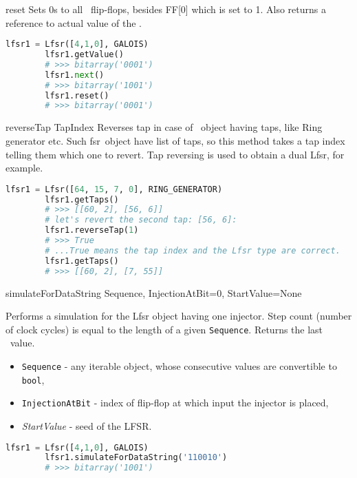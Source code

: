  {reset} {} {
	Sets 0s to all \Lfsr\ flip-flops, besides FF[0] which is set to 1. Also returns a reference to actual value of the \Lfsr.
}
\begin{lstlisting}[language=Python]
		lfsr1 = Lfsr([4,1,0], GALOIS)
		lfsr1.getValue()
		# >>> bitarray('0001')
		lfsr1.next()
		# >>> bitarray('1001')
		lfsr1.reset()
		# >>> bitarray('0001')
\end{lstlisting}

 {reverseTap} {TapIndex} {
	Reverses tap in case of \Lfsr\ object having taps, like Ring generator etc. Such \:fsr\ object have list of taps, so this method takes a tap index telling them which one to revert. Tap reversing is used to obtain a dual Lfsr, for example.
}
\begin{lstlisting}[language=Python]
		lfsr1 = Lfsr([64, 15, 7, 0], RING_GENERATOR)
		lfsr1.getTaps()
		# >>> [[60, 2], [56, 6]]
		# let's revert the second tap: [56, 6]:
		lfsr1.reverseTap(1)
		# >>> True
		# ...True means the tap index and the Lfsr type are correct.
		lfsr1.getTaps()
		# >>> [[60, 2], [7, 55]]
\end{lstlisting}

 {simulateForDataString} {Sequence, InjectionAtBit=0, StartValue=None} {
	Performs a simulation for the Lfsr object having one injector. Step count (number of clock cycles) is equal to the length of a given \texttt{Sequence}. Returns the last \Lfsr\ value.
	\begin{itemize}
		\item \texttt{Sequence} - any iterable object, whose consecutive values are convertible to \texttt{bool},
		\item \texttt{InjectionAtBit} - index of flip-flop at which input the injector is placed,
		\item \textit{StartValue} - seed of the LFSR.
	\end{itemize}
}
\begin{lstlisting}[language=Python]
		lfsr1 = Lfsr([4,1,0], GALOIS)
		lfsr1.simulateForDataString('110010')
		# >>> bitarray('1001')
\end{lstlisting}

